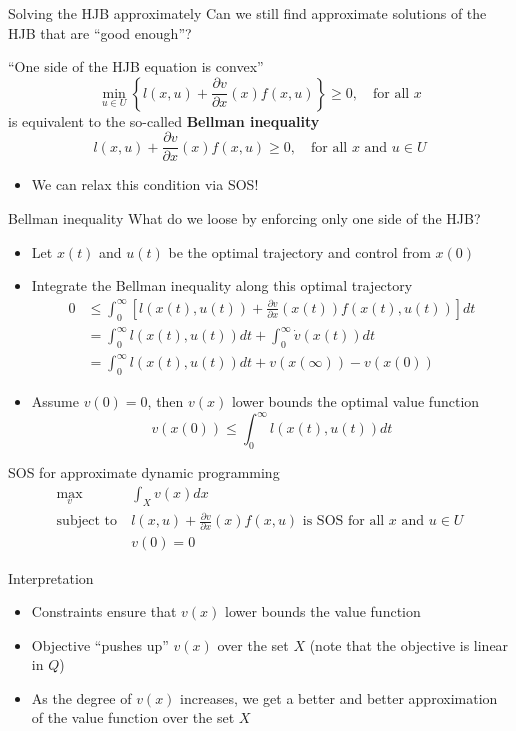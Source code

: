 \documentclass[aspectratio=169]{beamer}
\begin{document}
\begin{frame}{Solving the HJB approximately}
Can we still find approximate solutions of the HJB that are ``good enough''?
\begin{block}{``One side of the HJB equation is convex''}
$$
\min_{u \in U} \left\{ l(x, u) + \frac{\partial v}{\partial x} (x) f(x, u) \right\} \geq 0, \quad \text{for all } x
$$
is equivalent to the so-called \textbf{Bellman inequality}
$$
l(x, u) + \frac{\partial v}{\partial x} (x) f(x, u) \geq 0, \quad \text{for all } x \text{ and } u \in U
$$
\vspace{-5mm}
\begin{itemize}
\item
We can relax this condition via SOS!
\end{itemize}
\end{block}
\end{frame}



\begin{frame}{Bellman inequality}
What do we loose by enforcing only one side of the HJB?
\pause
\begin{itemize}
\item
Let $x(t)$ and $u(t)$ be the optimal trajectory and control from $x(0)$
\pause
\item
Integrate the Bellman inequality along this optimal trajectory
\begin{align*}
0 & \leq \int_0^\infty \left[ l(x(t), u(t)) + \frac{\partial v}{\partial x} (x(t)) f(x(t), u(t)) \right] dt \\
& = \int_0^\infty l(x(t), u(t)) dt + \int_0^\infty \dot v(x(t)) dt \\
& = \int_0^\infty l(x(t), u(t)) dt + v(x(\infty)) - v(x(0))
\end{align*}
\pause
\item
Assume $v(0) = 0$, then $v(x)$ lower bounds the optimal value function
$$
v(x(0)) \leq \int_0^\infty l(x(t), u(t)) dt
$$
\end{itemize}
\end{frame}

\begin{frame}{SOS for approximate dynamic programming}
\begin{align*}
\max_v \ &\int_X v(x) dx \\
\text{subject to} \ & l(x, u) + \frac{\partial v}{\partial x} (x) f(x, u) \text{ is SOS for all } x \text{ and } u \in U \\
& v(0) = 0
\end{align*}
\vspace{-5mm}
\begin{block}{Interpretation}
\begin{itemize}
\item
Constraints ensure that $v(x)$ lower bounds the value function
\item
Objective ``pushes up'' $v(x)$ over the set $X$ (note that the objective is linear in $Q$)
\item
As the degree of $v(x)$ increases, we get a better and better approximation of the value function over the set $X$
\end{itemize}
\end{block}
\end{frame}
\end{document}
